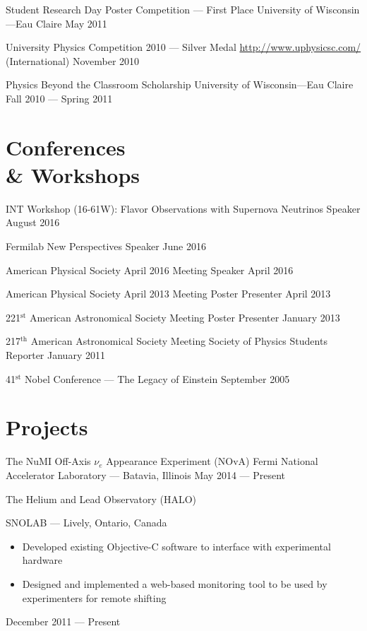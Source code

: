 \documentclass{cv}
\begin{document}
\begin{resume}
\object
{Student Research Day Poster Competition --- First Place}
{University of Wisconsin---Eau Claire}
{May 2011}


\object
{University Physics Competition 2010 --- Silver Medal}
{\href{http://www.uphysicsc.com/}{http://www.uphysicsc.com/} (International)}
{November 2010}


\object
{Physics Beyond the Classroom Scholarship}
{University of Wisconsin---Eau Claire}
{Fall 2010 --- Spring 2011}



\section{Conferences \\ \& Workshops}

\objectLarge
{INT Workshop (16-61W): Flavor Observations with}
{Supernova Neutrinos}
{Speaker}
{August 2016}

\object
{Fermilab New Perspectives}
{Speaker}
{June 2016}

\object
{American Physical Society April 2016 Meeting}
{Speaker}
{April 2016}


\object
{American Physical Society April 2013 Meeting}
{Poster Presenter}
{April 2013}


\object
{221$^\text{st}$ American Astronomical Society Meeting}
{Poster Presenter}
{January 2013}


\object
{217$^\text{th}$ American Astronomical Society Meeting}
{Society of Physics Students Reporter}
{January 2011}


\object
{41$^\text{st}$ Nobel Conference --- The Legacy of Einstein}
{}
{September 2005}




\section{Projects}

\object
{The NuMI Off-Axis $\nu_e$ Appearance Experiment (NOvA)}
{Fermi National Accelerator Laboratory --- Batavia, Illinois \noemph}
{May 2014 --- Present}

\object
{The Helium and Lead Observatory (HALO)}
{SNOLAB --- Lively, Ontario, Canada \noemph
	\begin{itemize}
		\item Developed existing Objective-C software to interface with experimental hardware
		\item Designed and implemented a web-based monitoring tool to be used by experimenters for remote shifting
	\end{itemize}
 }
{December 2011 --- Present}



\end{resume}
\end{document}
